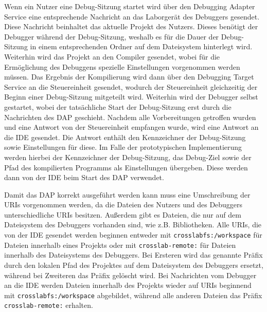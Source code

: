 Wenn ein Nutzer eine Debug-Sitzung startet wird über den Debugging Adapter Service eine entsprechende Nachricht an das Laborgerät des Debuggers gesendet. Diese Nachricht beinhaltet das aktuelle Projekt des Nutzers. Dieses benötigt der Debugger während der Debug-Sitzung, weshalb es für die Dauer der Debug-Sitzung in einem entsprechenden Ordner auf dem Dateisystem hinterlegt wird. Weiterhin wird das Projekt an den Compiler gesendet, wobei für die Ermöglichung des Debuggens spezielle Einstellungen vorgenommen werden müssen. Das Ergebnis der Kompilierung wird dann über den Debugging Target Service an die Steuereinheit gesendet, wodurch der Steuereinheit gleichzeitig der Beginn einer Debug-Sitzung mitgeteilt wird. Weiterhin wird der Debugger selbst gestartet, wobei der tatsächliche Start der Debug-Sitzung erst durch die Nachrichten des \ac{DAP} geschieht. Nachdem alle Vorbereitungen getroffen wurden und eine Antwort von der Steuereinheit empfangen wurde, wird eine Antwort an die IDE gesendet. Die Antwort enthält den Kennzeichner der Debug-Sitzung sowie Einstellungen für diese. Im Falle der prototypischen Implementierung werden hierbei der Kennzeichner der Debug-Sitzung, das Debug-Ziel sowie der Pfad des kompilierten Programms als Einstellungen übergeben. Diese werden dann von der IDE beim Start des \ac{DAP} verwendet.

Damit das \ac{DAP} korrekt ausgeführt werden kann muss eine Umschreibung der URIs vorgenommen werden, da die Dateien des Nutzers und des Debuggers unterschiedliche URIs besitzen. Außerdem gibt es Dateien, die nur auf dem Dateisystem des Debuggers vorhanden sind, wie z.B. Bibliotheken. Alle URIs, die von der IDE gesendet werden beginnen entweder mit \texttt{crosslabfs:/workspace} für Dateien innerhalb eines Projekts oder mit \texttt{crosslab-remote:} für Dateien innerhalb des Dateisystems des Debuggers. Bei Ersteren wird das genannte Präfix durch den lokalen Pfad des Projektes auf dem Dateisystem des Debuggers ersetzt, während bei Zweiteren das Präfix gelöscht wird. Bei Nachrichten vom Debugger an die IDE werden Dateien innerhalb des Projekts wieder auf URIs beginnend mit \texttt{crosslabfs:/workspace} abgebildet, während alle anderen Dateien das Präfix \texttt{crosslab-remote:} erhalten.

